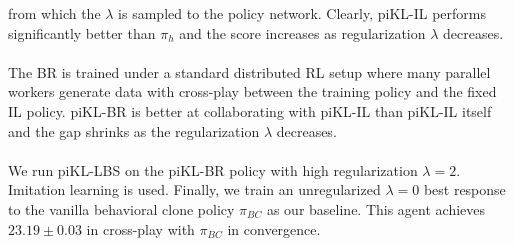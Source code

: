 \documentclass[12pt]{article}
\begin{document}
from which the $\lambda$ is sampled to the policy network. Clearly, piKL-IL performs significantly better than $\pi_h$ and the
score increases as regularization $\lambda$ decreases.\\
\\
The BR is trained under a standard distributed RL setup where many parallel workers generate data
with cross-play between the training policy and the fixed IL policy. piKL-BR is
better at collaborating with piKL-IL than piKL-IL itself and the gap shrinks as the regularization $\lambda$
decreases.\\
\\
We run piKL-LBS on the piKL-BR policy with high regularization $\lambda = 2$. Imitation
learning is used. Finally, we train an unregularized $\lambda = 0$ best response to the vanilla behavioral clone policy $\pi_{BC}$ as our baseline. This agent achieves $23.19 \pm 0.03$ in cross-play with $\pi_{BC}$ in convergence.
\end{document}
